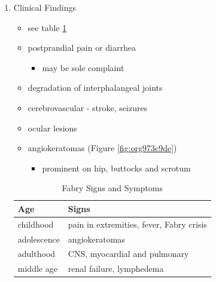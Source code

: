 \documentclass{scrartcl}
\begin{document}
\begin{enumerate}
\item Clinical Findings
\label{sec:org418bb9b}
\begin{itemize}
\item see table \ref{tab:org37cdcb4}
\item postprandial pain or diarrhea
\begin{itemize}
\item may be sole complaint
\end{itemize}
\item degradation of interphalangeal joints
\item cerebrovascular - stroke, seizures
\item ocular lesions
\item angiokeratomas (Figure \ref{fig:org973c9de})
\begin{itemize}
\item prominent on hip, buttocks and scrotum
\end{itemize}
\end{itemize}

\begin{table}[htbp]
\caption{\label{tab:org37cdcb4}
Fabry Signs and Symptoms}
\centering
\begin{tabular}{ll}
Age & Signs\\
\hline
childhood & pain in extremities, fever, Fabry crisis \footnotemark\\
adolescence & angiokeratomas\\
adulthood & CNS, myocardial and pulmonary\\
middle age & renal failure, lymphedema\\
\end{tabular}
\end{table}


\end{enumerate}
\end{document}

